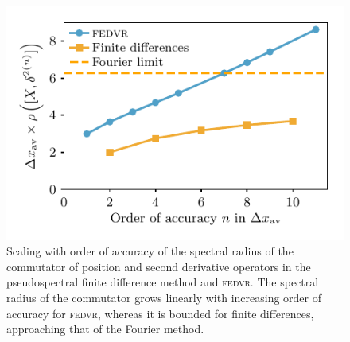 \begin{figure}[t]
    \centerfloat
    \includegraphics{figures/numerics/fedvr_commutation_error_scaling.pdf}
    \caption{Scaling with order of accuracy of the spectral radius of the commutator of position and second derivative operators in the pseudospectral finite difference method and \textsc{fedvr}. The spectral radius of the commutator grows linearly with increasing order of accuracy for \textsc{fedvr}, whereas it is bounded for finite differences, approaching that of the Fourier method.}
    \label{fig:fedvr_commutation_error_scaling}
\end{figure}

